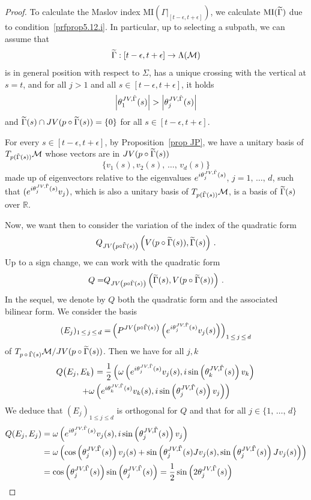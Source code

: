 \documentclass[AHL, Unicode, longabstracts, published]{cedram}
\newcommand*\M{\mathcal{M}}
\newcommand{\MI}{\mathrm{MI}}
\newcommand*\R{\mathbb{R}}
\let\oldtilde\tilde
\renewcommand*{\tilde}[1]{\mathchoice{\widetilde{#1}}{\widetilde{#1}}{\oldtilde{#1}}{\oldtilde{#1}}}
\begin{document}
\begin{proof}
To calculate the Maslov index $\MI(\Gamma|_{[t-\epsilon,t+\epsilon]})$, we calculate $\MI(\tilde\Gamma)$ due to condition~\eqref{prfprop5.12.i}. In particular, up to selecting a subpath, we can assume that
\[
\tilde\Gamma:{ [t-\epsilon,t+\epsilon]} \to\Lambda(\M)
\]
is in general position with respect to $\Sigma$, has a unique crossing with the vertical at {$s=t$}, and for all $j>1$ and all $s\in[t-\epsilon,t+\epsilon]$,
it holds
\[
\left|\theta_1^{JV,\tilde\Gamma}(s)\right|>\left|\theta_j^{JV,\tilde\Gamma}(s)\right|
\]
and $\tilde\Gamma(s)\cap JV(p\circ\tilde\Gamma(s))=\{0\}$ for all 
$s\in[t-\epsilon,t+\epsilon]$.

For every $s\in[t-\epsilon,t+\epsilon]$, by Proposition~\ref{prop JP}, we have a unitary basis of $T_{p(\tilde\Gamma(s))}\M$ whose vectors are in $JV(p\circ\tilde\Gamma(s))$
\[
\{v_1(s),v_2(s),\,\dots,\,v_d(s)\}
\]
made up of eigenvectors relative to the eigenvalues $e^{i\theta_j^{JV,\tilde\Gamma}(s)}$, $j=1,\,\dots,\,d$, {such that $(e^{i\theta_j^{JV,\tilde\Gamma}(s)}v_j)$, which is also a unitary basis of $T_{p(\tilde\Gamma(s))}\M$, is a basis of $\tilde \Gamma(s)$ over $\R$}.

Now, we want then to consider the variation of the index of the quadratic form
\[
Q_{JV\left(p\circ\tilde\Gamma(s)\right)}\left(V(p\circ\tilde\Gamma(s)),\tilde\Gamma(s)\right)\,.
\]
Up to a sign change, we can work with the quadratic form
\[
{Q=} Q_{JV\left(p\circ\tilde\Gamma(s)\right)}\left(\tilde\Gamma(s),V(p\circ\tilde\Gamma(s))\right)\,.
\]
In the sequel, we denote by $Q$ both the quadratic form and the associated bilinear form.
We consider the basis
\[
{(E_j)_{1\,\leq\,j\,\leq\,d} =}\left(P^{JV\left(p\circ\tilde\Gamma(s)\right)}\left(e^{i\theta_j^{JV,\tilde\Gamma}(s)}v_j(s)\right)\right)_{1\,\leq\,j\,\leq\,d}
\]
of $T_{p\,\circ\,\tilde\Gamma(s)}\M/JV(p\circ\tilde\Gamma(s))$. Then we have for all $j, k$
\begin{multline*}
Q\big(E_j, E_k\big)
=\frac{1}{2}\left(\omega\left(e^{i\theta_j^{JV,\tilde\Gamma}(s)}v_j(s), i\sin\left(\theta_k^{JV,\tilde\Gamma}(s)\right)v_k\right)\right.\\
\left. + \omega\left(e^{i\theta_k^{JV,\tilde\Gamma}(s)}v_k(s), i\sin\left(\theta_j^{JV,\tilde\Gamma}(s)\right)v_j\right) \right)
\end{multline*}
We deduce that $(E_j)_{1\leq j\leq d}$ is orthogonal for $Q$ and that for all $j\in\{ 1,\,\dots,\,d\}$
\begin{align*}
{Q(E_j,E_j)}&=\omega\left(e^{i\theta_j^{JV,\tilde\Gamma}(s)}v_j(s), i\sin\left(\theta_j^{JV,\tilde\Gamma}(s)\right)v_j\right)\\
&=\omega \left(\cos\left(\theta_j^{JV,\tilde\Gamma}(s)\right)v_j(s)+\sin\left(\theta_j^{JV,\tilde\Gamma}(s)Jv_j(s),\sin\left(\theta_j^{JV,\tilde\Gamma}(s)\right)Jv_j(s)\right)\right)\\
&= \cos\left(\theta_j^{JV,\tilde\Gamma}(s)\right)\sin\left(\theta_j^{JV,\tilde\Gamma}(s)\right)=\frac{1}{2}\sin\left(2\theta_j^{JV,\tilde\Gamma}(s) \right)
\end{align*}



\end{proof}
\end{document}
